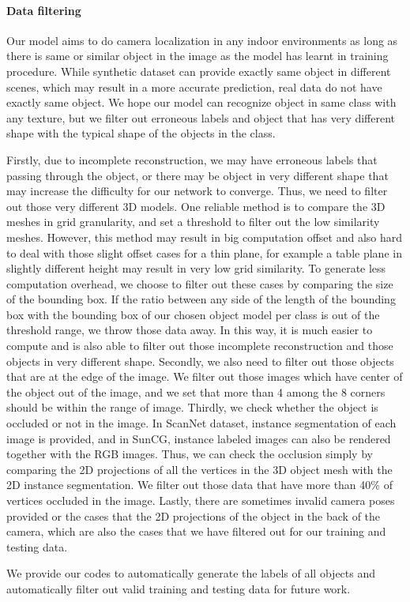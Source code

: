 \paragraph{Data filtering}
Our model aims to do camera localization in any indoor environments as long as there is same or similar object in the image as the model has learnt in training procedure. While synthetic dataset can provide exactly same object in different scenes, which may result in a more accurate prediction, real data do not have exactly same object. We hope our model can recognize object in same class with any texture, but we filter out erroneous labels and object that has very different shape with the typical shape of the objects in the class.

Firstly, due to incomplete reconstruction, we may have erroneous labels that passing through the object, or there may be object in very different shape that may increase the difficulty for our network to converge. Thus, we need to filter out those very different 3D models. One reliable method is to compare the 3D meshes in grid granularity, and set a threshold to filter out the low similarity meshes. However, this method may result in big computation offset and also hard to deal with those slight offset cases for a thin plane, for example a table plane in slightly different height may result in very low grid similarity. To generate less computation overhead, we choose to filter out these cases by comparing the size of the bounding box. If the ratio between any side of the length of the bounding box with the bounding box of our chosen object model per class is out of the threshold range, we throw those data away. In this way, it is much easier to compute and is also able to filter out those incomplete reconstruction and those objects in very different shape. Secondly, we also need to filter out those objects that are at the edge of the image. We filter out those images which have center of the object out of the image, and we set that more than 4 among the 8 corners should be within the range of image. Thirdly, we check whether the object is occluded or not in the image. In ScanNet dataset, instance segmentation of each image is provided, and in SunCG, instance labeled images can also be rendered together with the RGB images. Thus, we can check the occlusion simply by comparing the 2D projections of all the vertices in the 3D object mesh with the 2D instance segmentation. We filter out those data that have more than 40\% of vertices occluded in the image. Lastly, there are sometimes invalid camera poses provided or the cases that the 2D projections of the object in the back of the camera, which are also the cases that we have filtered out for our training and testing data.


We provide our codes to automatically generate the labels of all objects and automatically filter out valid training and testing data for future work.



